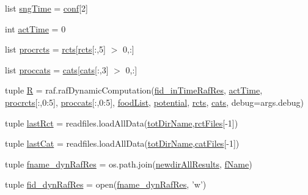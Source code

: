 \begin{DoxyCompactItemize}
\item 
list \hyperlink{a00111_ab4296f1ae2e4c4bb597ca27e84849510}{sng\-Time} = \hyperlink{a00111_adc567db25548116293968a9102beab98}{conf}\mbox{[}2\mbox{]}
\item 
int \hyperlink{a00111_a9c2013c88f8354ccf6504c51843f1d5e}{act\-Time} = 0
\item 
list \hyperlink{a00111_a2120e8355b3501aed0114a74091d56c1}{procrcts} = \hyperlink{a00111_ac2fe1ed3228b8e616f25ccfbe4cc7dc4}{rcts}\mbox{[}\hyperlink{a00111_ac2fe1ed3228b8e616f25ccfbe4cc7dc4}{rcts}\mbox{[}\-:,5\mbox{]} $>$ 0,\-:\mbox{]}
\item 
list \hyperlink{a00111_a4e3c4b627d098aef6c7905cb20683e07}{proccats} = \hyperlink{a00111_adc0282a6415a88834556e66807bcc800}{cats}\mbox{[}\hyperlink{a00111_adc0282a6415a88834556e66807bcc800}{cats}\mbox{[}\-:,3\mbox{]} $>$ 0,\-:\mbox{]}
\item 
tuple \hyperlink{a00111_aa51f04a64cdea4fbde3c2d484d06d443}{R} = raf.\-raf\-Dynamic\-Computation(\hyperlink{a00111_ab82095abcedb97b7abf8e003f4724d0c}{fid\-\_\-in\-Time\-Raf\-Res}, \hyperlink{a00111_a9c2013c88f8354ccf6504c51843f1d5e}{act\-Time}, \hyperlink{a00111_a2120e8355b3501aed0114a74091d56c1}{procrcts}\mbox{[}\-:,0\-:5\mbox{]}, \hyperlink{a00111_a4e3c4b627d098aef6c7905cb20683e07}{proccats}\mbox{[}\-:,0\-:5\mbox{]}, \hyperlink{a00111_a07ce1f0750b6dc5baff89792fc194152}{food\-List}, \hyperlink{a00111_abe4c267a63409b1b7cd9c6aaf0779b4a}{potential}, \hyperlink{a00111_ac2fe1ed3228b8e616f25ccfbe4cc7dc4}{rcts}, \hyperlink{a00111_adc0282a6415a88834556e66807bcc800}{cats}, debug=args.\-debug)
\item 
tuple \hyperlink{a00111_a519d451fb14acb6fb50a108ac2b8b261}{last\-Rct} = readfiles.\-load\-All\-Data(\hyperlink{a00111_a82f73a786e4c93e909fd689ee0d0812e}{tot\-Dir\-Name},\hyperlink{a00111_a9016a8f5eafe76e4e8dbb1bc3ce94af5}{rct\-Files}\mbox{[}-\/1\mbox{]})
\item 
tuple \hyperlink{a00111_ad65fb0887c659a9bf884cba677b67272}{last\-Cat} = readfiles.\-load\-All\-Data(\hyperlink{a00111_a82f73a786e4c93e909fd689ee0d0812e}{tot\-Dir\-Name},\hyperlink{a00111_a189dc9cf606d870dacab059d5e7dca24}{cat\-Files}\mbox{[}-\/1\mbox{]})
\item 
tuple \hyperlink{a00111_a6a031fb0c5a0a5519fc4c3f6d7ef35d1}{fname\-\_\-dyn\-Raf\-Res} = os.\-path.\-join(\hyperlink{a00111_af73b43f5468097ae9443adeb6010a75c}{newdir\-All\-Results}, \hyperlink{a00111_a9fff4b23f9489649601960dabc4a6cdd}{f\-Name})
\item 
tuple \hyperlink{a00111_aaff6b4fb4c2e2089c2a207a12f1757e3}{fid\-\_\-dyn\-Raf\-Res} = open(\hyperlink{a00111_a6a031fb0c5a0a5519fc4c3f6d7ef35d1}{fname\-\_\-dyn\-Raf\-Res}, 'w')

\end{DoxyCompactItemize}
